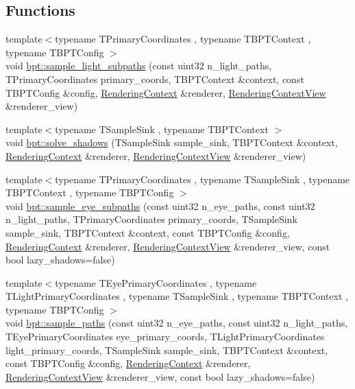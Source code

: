 \subsection*{Functions}
\begin{DoxyCompactItemize}
\item 
{\footnotesize template$<$typename T\+Primary\+Coordinates , typename T\+B\+P\+T\+Context , typename T\+B\+P\+T\+Config $>$ }\\void \hyperlink{group___b_p_t_lib_ga679afc8704a42ed1c8e6b57018cd676e}{bpt\+::sample\+\_\+light\+\_\+subpaths} (const uint32 n\+\_\+light\+\_\+paths, T\+Primary\+Coordinates primary\+\_\+coords, T\+B\+P\+T\+Context \&context, const T\+B\+P\+T\+Config \&config, \hyperlink{struct_rendering_context}{Rendering\+Context} \&renderer, \hyperlink{struct_rendering_context_view}{Rendering\+Context\+View} \&renderer\+\_\+view)
\item 
{\footnotesize template$<$typename T\+Sample\+Sink , typename T\+B\+P\+T\+Context $>$ }\\void \hyperlink{group___b_p_t_lib_ga67c2c1dbc4ee8212daf3728fafe55969}{bpt\+::solve\+\_\+shadows} (T\+Sample\+Sink sample\+\_\+sink, T\+B\+P\+T\+Context \&context, \hyperlink{struct_rendering_context}{Rendering\+Context} \&renderer, \hyperlink{struct_rendering_context_view}{Rendering\+Context\+View} \&renderer\+\_\+view)
\item 
{\footnotesize template$<$typename T\+Primary\+Coordinates , typename T\+Sample\+Sink , typename T\+B\+P\+T\+Context , typename T\+B\+P\+T\+Config $>$ }\\void \hyperlink{group___b_p_t_lib_ga5dcb245a5dfa3a0910069446d27aa8eb}{bpt\+::sample\+\_\+eye\+\_\+subpaths} (const uint32 n\+\_\+eye\+\_\+paths, const uint32 n\+\_\+light\+\_\+paths, T\+Primary\+Coordinates primary\+\_\+coords, T\+Sample\+Sink sample\+\_\+sink, T\+B\+P\+T\+Context \&context, const T\+B\+P\+T\+Config \&config, \hyperlink{struct_rendering_context}{Rendering\+Context} \&renderer, \hyperlink{struct_rendering_context_view}{Rendering\+Context\+View} \&renderer\+\_\+view, const bool lazy\+\_\+shadows=false)
\item 
{\footnotesize template$<$typename T\+Eye\+Primary\+Coordinates , typename T\+Light\+Primary\+Coordinates , typename T\+Sample\+Sink , typename T\+B\+P\+T\+Context , typename T\+B\+P\+T\+Config $>$ }\\void \hyperlink{group___b_p_t_lib_ga4c1164d859ed146eb306e8b7b178c7e7}{bpt\+::sample\+\_\+paths} (const uint32 n\+\_\+eye\+\_\+paths, const uint32 n\+\_\+light\+\_\+paths, T\+Eye\+Primary\+Coordinates eye\+\_\+primary\+\_\+coords, T\+Light\+Primary\+Coordinates light\+\_\+primary\+\_\+coords, T\+Sample\+Sink sample\+\_\+sink, T\+B\+P\+T\+Context \&context, const T\+B\+P\+T\+Config \&config, \hyperlink{struct_rendering_context}{Rendering\+Context} \&renderer, \hyperlink{struct_rendering_context_view}{Rendering\+Context\+View} \&renderer\+\_\+view, const bool lazy\+\_\+shadows=false)

\end{DoxyCompactItemize}
